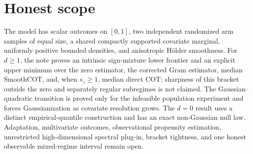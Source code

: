 \documentclass{article}
\begin{document}
\section{Honest scope}

The model has scalar outcomes on \([0,1]\), two independent randomized arm samples of equal size, a shared compactly supported covariate marginal, uniformly positive bounded densities, and anisotropic H\"older smoothness. For \(d\ge1\), the note proves an intrinsic sign-mixture lower frontier and an explicit upper minimum over the zero estimator, the corrected Gram estimator, median SmoothCOT, and, when \(s_z\ge1\), median direct COT; sharpness of this bracket outside the zero and separately regular subregimes is not claimed. The Gaussian--quadratic transition is proved only for the infeasible population experiment and forces Gaussianization as covariate resolution grows. The \(d=0\) result uses a distinct empirical-quantile construction and has an exact non-Gaussian null law. Adaptation, multivariate outcomes, observational propensity estimation, unrestricted high-dimensional spectral plug-in, bracket tightness, and one honest observable mixed-regime interval remain open.
\end{document}
